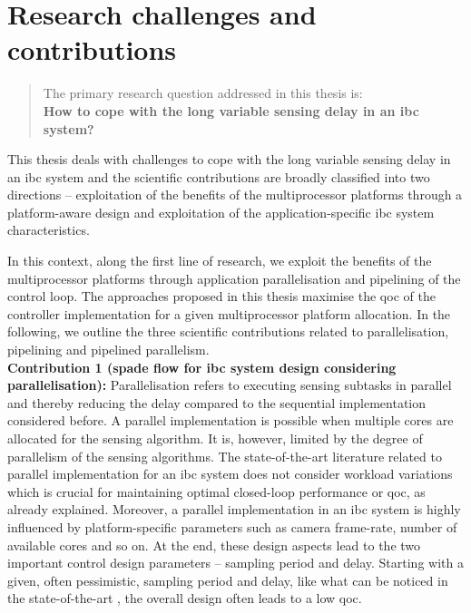 \section{Research challenges and contributions}
\label{chap:challenges}
\begin{quote}
\centering
The primary research question addressed in this thesis is:\\ \textbf{How to cope with the long variable sensing delay in an \gls{ibc} system?}
\end{quote}
This thesis deals with challenges to cope with the long variable sensing delay in an \gls{ibc} system and the scientific contributions are broadly classified into two directions -- exploitation of the benefits of the multiprocessor platforms through a platform-aware design and exploitation of the application-specific \gls{ibc} system characteristics. 

 In this context, along the first line of research, we exploit the benefits of the multiprocessor platforms through application parallelisation and pipelining of the control loop. 
 The approaches proposed in this thesis maximise the \gls{qoc} of the controller implementation for a given multiprocessor platform allocation.
In the following, we outline the three scientific contributions related to parallelisation, pipelining and pipelined parallelism.
\\[1ex]
\noindent
\textbf{Contribution 1 (\Gls{spade} flow for \Gls{ibc} system design considering parallelisation):}
Parallelisation refers to executing sensing subtasks in parallel and thereby reducing the delay compared to the sequential implementation considered before. A parallel implementation is possible when multiple cores are allocated for the sensing algorithm. 
It is, however, limited by the degree of parallelism of the sensing algorithms. The state-of-the-art literature related to parallel implementation for an \gls{ibc} system does not consider workload variations which is crucial for maintaining optimal closed-loop performance or \gls{qoc}, as already explained. Moreover, a parallel implementation in an \gls{ibc} system is highly influenced by platform-specific parameters such as camera frame-rate, number of available cores and so on. At the end, these design aspects lead to the two important control design parameters --  sampling period and delay. Starting with a given, often pessimistic, sampling period and delay, like what can be noticed in the state-of-the-art \cite{krautgartner1998performance}, the overall design often leads to a low \gls{qoc}.

